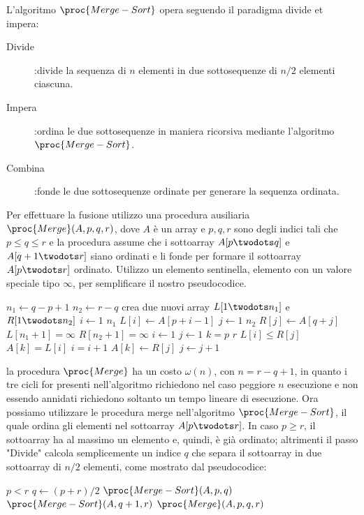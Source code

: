 L'algoritmo $\proc{Merge-Sort}$ opera seguendo il paradigma divide et impera:
\begin{description}
    \item[Divide]:divide la sequenza di $n$ elementi in due sottosequenze di $n/2$ elementi ciascuna.
    \item[Impera]:ordina le due sottosequenze in maniera ricorsiva mediante l'algoritmo $\proc{Merge-Sort}$.
    \item[Combina]:fonde le due sottosequenze ordinate per generare la sequenza ordinata.
\end{description}
Per effettuare la fusione utilizzo una procedura ausiliaria $\proc{Merge}(A,p,q,r)$,
dove $A$ è un array e $p,q,r$ sono degli indici tali che $p \leq q \leq r$ e la
procedura assume che i sottoarray $A[p \twodots q]$ e $A[q+1 \twodots r]$ siano ordinati
e li fonde per formare il sottoarray $A[p \twodots r]$ ordinato.
Utilizzo un elemento sentinella, elemento con un valore speciale tipo $\infty$,
per semplificare il nostro pseudocodice.
\begin{codebox}
\li $n_1 \gets q - p + 1$
\li $n_2 \gets r - q$
\li crea due nuovi array $L[1 \twodots n_1]$ e $R[1 \twodots n_2]$
\li \For $i \gets 1$ \To $n_1$
         \Do
\li      $L[i] \gets A[p+i-1]$
        \End
\li \For $j \gets 1$ \To $n_2$
        \Do
\li      $R[j] \gets A[q+j]$
        \End
\li $L[n_1+1] = \infty$
\li $R[n_2+1] = \infty$
\li $i \gets 1$
\li $j \gets 1$
\li \For $k = p$ \To $r$
    \Do
\li      \If $L[i] \leq R[j]$
         \Then
\li              $A[k] = L[i]$
\li              $i = i+1$
         \End
\li      \Else $A[k] \gets R[j]$
\li            $j \gets j+1$
    \End
\end{codebox}


la procedura $\proc{Merge}$ ha un costo $\omega(n)$, con $n = r-q+1$, in quanto
i tre cicli for presenti nell'algoritmo richiedono nel caso peggiore $n$ esecuzione
e non essendo annidati richiedono soltanto un tempo lineare di esecuzione.
Ora possiamo utilizzare le procedura merge nell'algoritmo $\proc{Merge-Sort}$, il quale
ordina gli elementi nel sottoarray $A[p \twodots r]$.
In caso $p \geq r$, il sottoarray ha al massimo un elemento e, quindi, è già ordinato;
altrimenti il passo "Divide" calcola semplicemente un indice $q$ che separa il sottoarray
in due sottoarray di $n/2$ elementi, come mostrato dal pseudocodice:
\begin{codebox}
\li \If $p < r$
    \Then
\li     $q \gets (p+r)/ 2$
\li     $\proc{Merge-Sort}(A,p,q)$
\li     $\proc{Merge-Sort}(A,q+1,r)$
\li     $\proc{Merge}(A,p,q,r)$
    \End
\end{codebox}

